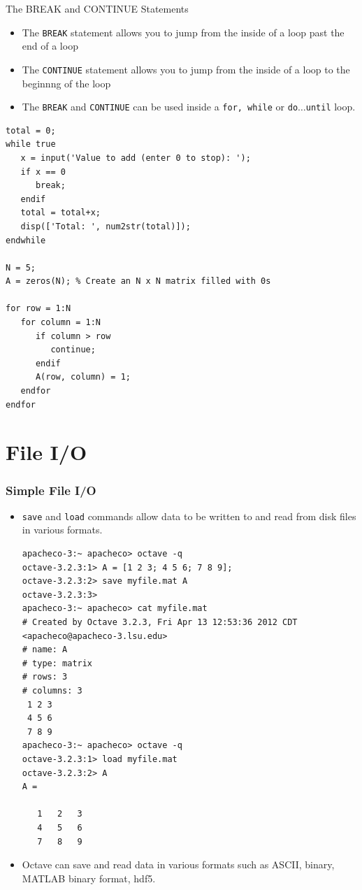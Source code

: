 \documentclass[slidestop,mathserif,compress,xcolor=svgnames]{beamer}
\newenvironment{eblock}[0]
{
\begin{beamerboxesrounded}[upper=uppercol2,lower=lowercol2,shadow=true]}
{\end{beamerboxesrounded}}
\begin{document}
\begin{frame}
  \begin{eblock}{The BREAK and CONTINUE Statements}
    \begin{itemize}
      \item[] The \texttt{BREAK} statement allows you to jump from the inside of a loop past the end of a loop
      \item[] The \texttt{CONTINUE} statement allows you to jump from the inside of a loop to the beginnng of the loop
      \item[] The \texttt{BREAK} and \texttt{CONTINUE} can be used inside a \texttt{for, while} or \texttt{do$\dots$until} loop.
    \end{itemize}
    {\tiny
        \begin{verbatim}
total = 0;
while true
   x = input('Value to add (enter 0 to stop): ');
   if x == 0
      break;
   endif
   total = total+x;
   disp(['Total: ', num2str(total)]);
endwhile

N = 5;
A = zeros(N); % Create an N x N matrix filled with 0s

for row = 1:N
   for column = 1:N
      if column > row
         continue;
      endif
      A(row, column) = 1;
   endfor
endfor
        \end{verbatim}
    }
  \end{eblock}
\end{frame}

\section{File I/O}
\begin{frame}
  \frametitle{\small Simple File I/O}
  \begin{itemize}
    \item \texttt{save} and \texttt{load} commands allow data to be written to and read from disk files in various formats.
    {\tiny
      \begin{verbatim}
apacheco-3:~ apacheco> octave -q
octave-3.2.3:1> A = [1 2 3; 4 5 6; 7 8 9];
octave-3.2.3:2> save myfile.mat A
octave-3.2.3:3> 
apacheco-3:~ apacheco> cat myfile.mat 
# Created by Octave 3.2.3, Fri Apr 13 12:53:36 2012 CDT <apacheco@apacheco-3.lsu.edu>
# name: A
# type: matrix
# rows: 3
# columns: 3
 1 2 3
 4 5 6
 7 8 9
apacheco-3:~ apacheco> octave -q
octave-3.2.3:1> load myfile.mat
octave-3.2.3:2> A
A =

   1   2   3
   4   5   6
   7   8   9
      \end{verbatim}
    }
    \item Octave can save and read data in various formats such as ASCII, binary, MATLAB binary format, hdf5.
  \end{itemize}
\end{frame}
\end{document}
